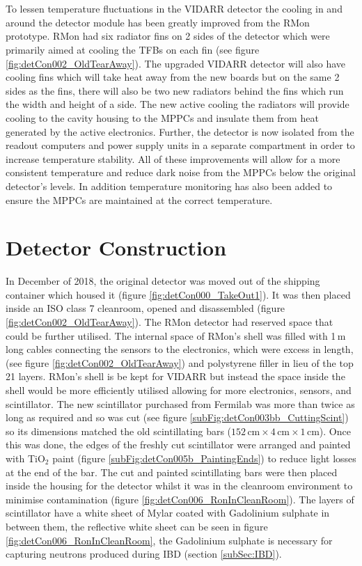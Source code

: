 \\\\To lessen temperature fluctuations in the VIDARR detector the cooling in and around the detector module has been greatly improved from the RMon prototype. RMon had six radiator fins on 2 sides of the detector which were primarily aimed at cooling the TFBs on each fin (see figure \ref{fig:detCon002_OldTearAway}). The upgraded VIDARR detector will also have cooling fins which will take heat away from the new boards but on the same 2 sides as the fins, there will also be two new radiators behind the fins which run the width and height of a side. The new active cooling the radiators will provide cooling to the cavity housing to the MPPCs and insulate them from heat generated by the active electronics. Further, the detector is now isolated from the readout computers and power supply units in a separate compartment in order to increase temperature stability. All of these improvements will allow for a more consistent temperature and reduce dark noise from the MPPCs below the original detector's levels. In addition temperature monitoring has also been added to ensure the MPPCs are maintained at the correct temperature.

\section{Detector Construction}\label{sec:DetectorConstruction}
In December of 2018, the original detector was moved out of the shipping container which housed it (figure \ref{fig:detCon000_TakeOut1}). It was then placed inside an ISO class 7 cleanroom, opened and disassembled (figure \ref{fig:detCon002_OldTearAway}). The RMon detector had reserved space that could be further utilised. The internal space of RMon's shell was filled with 1\,m long cables connecting the sensors to the electronics, which were excess in length, (see figure \ref{fig:detCon002_OldTearAway}) and polystyrene filler in lieu of the top 21 layers. RMon's shell is be kept for VIDARR but instead the space inside the shell would be more efficiently utilised allowing for more electronics, sensors, and scintillator. The new scintillator purchased from Fermilab was more than twice as long as required and so was cut (see figure \ref{subFig:detCon003bb_CuttingScint}) so its dimensions matched the old scintillating bars ($152\,\textrm{cm} \times 4\,\textrm{cm} \times 1\,\textrm{cm}$). Once this was done, the edges of the freshly cut scintillator were arranged and painted with TiO$_2$ paint (figure \ref{subFig:detCon005b_PaintingEnds}) to reduce light losses at the end of the bar. The cut and painted scintillating bars were then placed inside the housing for the detector whilst it was in the cleanroom environment to minimise contamination (figure \ref{fig:detCon006_RonInCleanRoom}). The layers of scintillator have a white sheet of Mylar coated with Gadolinium sulphate in between them, the reflective white sheet can be seen in figure \ref{fig:detCon006_RonInCleanRoom}, the Gadolinium sulphate is necessary for capturing neutrons produced during IBD (section \ref{subSec:IBD}). 

